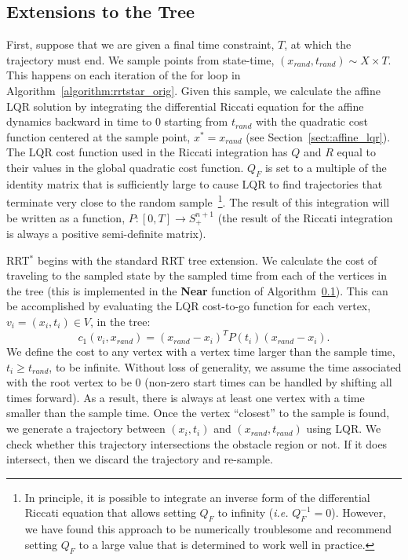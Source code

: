 \documentclass[letterpaper, 10pt, english, conference]{IEEEtran}
\begin{document}
\subsection{Extensions to the Tree}

First, suppose that we are given a final time constraint, $T$, at
which the trajectory must end. We sample points from state-time,
$(x_{rand}, t_{rand}) \sim X \times T$. This happens on each iteration
of the {\sc for} loop in Algorithm~\ref{algorithm:rrtstar_orig}. Given
this sample, we calculate the affine LQR solution by integrating the
differential Riccati equation for the affine dynamics backward in time
to $0$ starting from $t_{rand}$ with the quadratic cost function
centered at the sample point, $x^* = x_{rand}$ (see
Section~\ref{sect:affine_lqr}). The LQR cost function used in the
Riccati integration has $Q$ and $R$ equal to their values in the
global quadratic cost function. $Q_F$ is set to a multiple of the
identity matrix that is sufficiently large to cause LQR to find
trajectories that terminate very close to the random
sample~\footnote{In principle, it is possible to integrate an inverse
  form of the differential Riccati equation that allows setting $Q_F$
  to infinity ({\em i.e.} $Q_F^{-1} = 0$). However, we have found this
  approach to be numerically troublesome and recommend setting $Q_F$
  to a large value that is determined to work well in practice.}. The
result of this integration will be written as a function, $P: [0,T]
\to S^{n+1}_{+}$ (the result of the Riccati integration is always a
positive semi-definite matrix).

RRT$^*$ begins with the standard RRT tree extension. We calculate the
cost of traveling to the sampled state by the sampled time from each
of the vertices in the tree (this is implemented in the {\bf Near}
function of Algorithm~\ref{}). This can be accomplished by evaluating
the LQR cost-to-go function for each vertex, $v_i = (x_i, t_i) \in V$,
in the tree:
\[
c_1(v_i,x_{rand}) = (x_{rand} - x_i)^T P(t_i) (x_{rand} - x_i).
\]
We define the cost to any vertex with a vertex time larger than the
sample time, $t_i \geq t_{rand}$, to be infinite. Without loss of
generality, we assume the time associated with the root vertex to be
$0$ (non-zero start times can be handled by shifting all times
forward). As a result, there is always at least one vertex with a time
smaller than the sample time. Once the vertex ``closest'' to the
sample is found, we generate a trajectory between $(x_i, t_i)$ and
$(x_{rand}, t_{rand})$ using LQR. We check whether this trajectory
intersections the obstacle region or not. If it does intersect, then
we discard the trajectory and re-sample.
\end{document}
